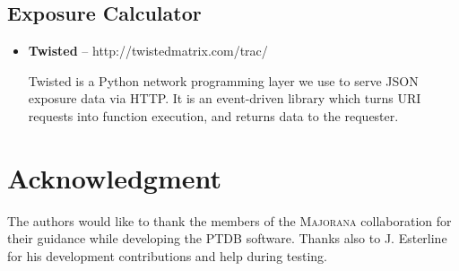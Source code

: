 \documentclass[journal]{IEEEtran}
\begin{document}
\subsection{Exposure Calculator}
\begin{itemize}
  \item \textbf{Twisted} -- http://twistedmatrix.com/trac/

   Twisted is a Python network programming layer we use to serve
   JSON exposure data via HTTP. It is an event-driven library which
   turns URI requests into function execution, and returns data
   to the requester.
\end{itemize}

\section*{Acknowledgment}
The authors would like to thank the members of the \textsc{Majorana} collaboration
for their guidance while developing the PTDB software. Thanks also
to J. Esterline for his development contributions and help during testing.


\ifCLASSOPTIONcaptionsoff
  \newpage
\fi








% 
\end{document}
